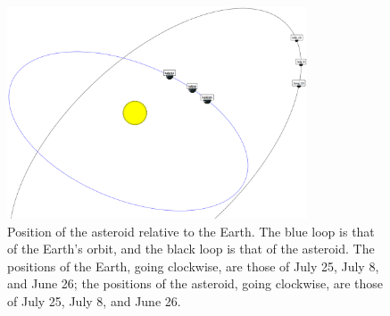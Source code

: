 \documentclass[12pt,journal,compsoc]{IEEEtran}
\begin{document}
\begin{figure}[!t]
\centering
\includegraphics[width=3.5in]{Lick_Orbit2.png}
\caption{Position of the asteroid relative to the Earth.  The blue loop is that of the Earth's orbit, and the black loop is that of the asteroid.  The positions of the Earth, going clockwise, are those of July 25, July 8, and June 26; the positions of the asteroid, going clockwise, are those of July 25, July 8, and June 26. }
\label{fig_sim}
\end{figure}

\begin{table}[!t]
\centering
{}
\caption{Measured orbital elements in comparison with JPL HORIZONS orbital elements of 1951 Lick}
\label{tab:HORIZONScomparison}
\end{table}
\end{document}
